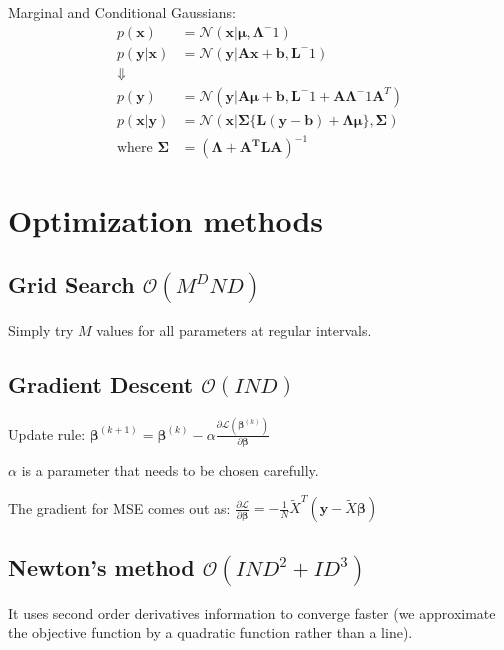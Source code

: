 \documentclass[10pt,a4paper,landscape]{article}
\renewcommand{\bf}[1]{\ensuremath{\mathbf{#1}}}
\newcommand{\bbeta}{\boldsymbol\beta}
\begin{document}
\begin{multicols*}{4}
Marginal and Conditional Gaussians:
$$
\begin{aligned}
p(\bf{x}) &= \mathcal{N}(\bf{x} | \boldsymbol\mu, \boldsymbol\Lambda^-1) \\
p(\bf{y}|\bf{x}) &= \mathcal{N}(\bf{y} | \bf{Ax + b, L}^-1) \\
\Downarrow \\
p(\bf{y}) &= \mathcal{N}(\bf{y} | \bf{A} \boldsymbol\mu + \bf{b}, \bf{L}^-1 + \bf{A} \boldsymbol\Lambda^-1 \bf{A}^T)	\\
p(\bf{x}|\bf{y}) &= \mathcal{N}(\bf{x} |\boldsymbol\Sigma \{ \bf{L(y - b) + \Lambda \mu} \}, \boldsymbol\Sigma) \\
\text{where } \boldsymbol\Sigma &= (\boldsymbol\Lambda + \bf{A^T L A})^{-1}
\end{aligned}
$$

\section{Optimization methods}

\subsection{Grid Search \small$\mathcal{O}(M^D N D)$}
Simply try $M$ values for all parameters at regular intervals.

\subsection{Gradient Descent \small$\mathcal{O}(I N D)$}
Update rule: $\bbeta^{(k+1)} = \bbeta^{(k)} - \alpha \frac{\partial \mathcal{L}(\bbeta^{(k)})}{\partial \bbeta}$


$\alpha$ is a parameter that needs to be chosen carefully.

The gradient for MSE comes out as:
$\frac{\partial \mathcal{L}}{\partial \bbeta} = - \frac{1}{N} \tilde{X}^T ( \boldsymbol y - \tilde{X} \bbeta )$

\subsection{Newton's method \small$\mathcal{O}(I N D^2 + I D^3)$}
It uses second order derivatives information to converge faster (we approximate the objective function by a quadratic function rather than a line).


\end{multicols*}
\end{document}

